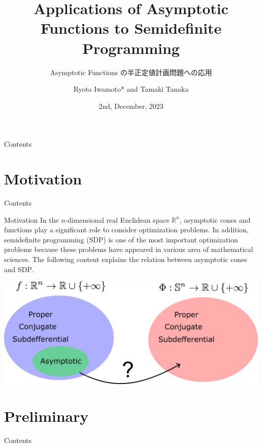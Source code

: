 \documentclass[aspectratio=169, dvipdfmx, 11pt]{beamer} %
\title[Asymptotic Functions の半正定値計画問題への応用]{Applications of Asymptotic Functions to Semidefinite Programming}
\subtitle{Asymptotic Functions の半正定値計画問題への応用}
\author[Ryota Iwamoto]{Ryota Iwamoto* and Tamaki Tanaka}
\institute[Niigata Univ]{Niigata Univ}
\date{2nd, December, 2023}
\newcommand{\NDemenstionalRealEuclidianSpace}{\mathbb{R}^n}
\begin{document}
\maketitle

\begin{frame}{Contents}
  \tableofcontents
\end{frame}

\section{Motivation}
\begin{frame}{Contents}
  \tableofcontents[currentsection]
\end{frame}

\begin{frame}{Motivation}
In the $n$-dimensional real Euclidean space $\NDemenstionalRealEuclidianSpace$, asymptotic cones and functions play a significant role to consider optimization problems. In addition, semidefinite programming (SDP) is one of the most important optimization problems because these problems have appeared in various area of mathematical sciences. The following content explains the relation between asymptotic cones and SDP.

\bigskip

\centering
\includegraphics[keepaspectratio, scale=0.09]{figures/summary_sendai_seminer_2023.eps}
\end{frame}

\section{Preliminary}
\begin{frame}{Contents}
  \tableofcontents[currentsection]
\end{frame}
\end{document}
